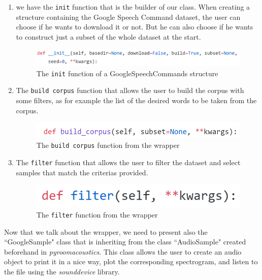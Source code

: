 \documentclass[11pt,a4paper,titlepage]{report}
\providecommand{\tightlist}{%
	\setlength{\itemsep}{0pt}\setlength{\parskip}{0pt}}
\begin{document}
\begin{enumerate}
	\tightlist
	\item  we have the \texttt{init} function that is the builder of our class. When creating a structure containing the Google Speech Command dataset, the user can choose if he wants to download it or not. But he can also choose if he wants to construct just a subset of the whole dataset at the start.\\
	\begin{figure}[h!]
		\centering
		\includegraphics[width=0.95\linewidth]{Rapport5}
		\caption{The \texttt{init} function of a GoogleSpeechCommands structure}
		\label{fig:rapport5}
	\end{figure}
	\item The \texttt{build corpus} function that allows the user to build the corpus with some filters, as for example the list of the desired words to be taken from the corpus.\\
	\begin{figure}[h!]
		\centering
		\includegraphics[width=0.7\linewidth]{Rapport6}
		\caption{The \texttt{build corpus} function from the wrapper}
		\label{fig:rapport6}
	\end{figure}
	\item The \texttt{filter} function that allows the user to filter the dataset and select samples that match the criterias provided.\\
	\begin{figure}[h!]
		\centering
		\includegraphics[width=0.4\linewidth]{Rapport7}
		\caption{The \texttt{filter} function from the wrapper}
		\label{fig:rapport7}
	\end{figure}
\end{enumerate}
\hspace*{0.6cm}
Now that we talk about the wrapper, we need to present also the ``GoogleSample" class that is inheriting from the class ``AudioSample" created beforehand in \textit{pyroomacoustics}. This class allows the user to create an audio object to print it in a nice way, plot the corresponding spectrogram, and listen to the file using the \emph{sounddevice} library.\cite{sounddevice}
\end{document}
